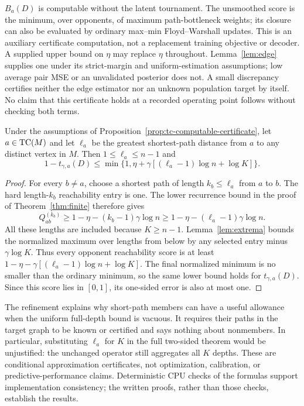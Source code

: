 $B_a(D)$ is computable without the latent tournament. The unsmoothed score is the minimum, over opponents, of maximum path-bottleneck weights; its closure can also be evaluated by ordinary max--min Floyd--Warshall updates. This is an auxiliary certificate computation, not a replacement training objective or decoder. A supplied upper bound on $\eta$ may replace $\eta$ throughout. Lemma~\ref{lem:edge} supplies one under its strict-margin and uniform-estimation assumptions; low average pair MSE or an unvalidated posterior does not. A small discrepancy certifies neither the edge estimator nor an unknown population target by itself. No claim that this certificate holds at a recorded operating point follows without checking both terms.

\begin{corollary}\label{cor:tc-short-path}
Under the assumptions of Proposition~\ref{prop:tc-computable-certificate}, let $a\in\mathrm{TC}(M)$ and let $\ell_a$ be the greatest shortest-path distance from $a$ to any distinct vertex in $M$. Then $1\le\ell_a\le n-1$ and
\[
1-t_{\gamma,a}(D)
\le\min\{1,\eta+\gamma[(\ell_a-1)\log n+\log K]\}.
\]
\end{corollary}
\begin{proof}
For every $b\ne a$, choose a shortest path of length $k_b\le\ell_a$ from $a$ to $b$. The hard length-$k_b$ reachability entry is one. The lower recurrence bound in the proof of Theorem~\ref{thm:finite} therefore gives
\[
Q^{(k_b)}_{ab}\ge1-\eta-(k_b-1)\gamma\log n
\ge1-\eta-(\ell_a-1)\gamma\log n.
\]
All these lengths are included because $K\ge n-1$. Lemma~\ref{lem:extrema} bounds the normalized maximum over lengths from below by any selected entry minus $\gamma\log K$. Thus every opponent reachability score is at least $1-\eta-\gamma[(\ell_a-1)\log n+\log K]$. The final normalized minimum is no smaller than the ordinary minimum, so the same lower bound holds for $t_{\gamma,a}(D)$. Since this score lies in $[0,1]$, its one-sided error is also at most one.
\end{proof}
The refinement explains why short-path members can have a useful allowance when the uniform full-depth bound is vacuous. It requires their paths in the target graph to be known or certified and says nothing about nonmembers. In particular, substituting $\ell_a$ for $K$ in the full two-sided theorem would be unjustified: the unchanged operator still aggregates all $K$ depths. These are conditional approximation certificates, not optimization, calibration, or predictive-performance claims. Deterministic CPU checks of the formulas support implementation consistency; the written proofs, rather than those checks, establish the results.
